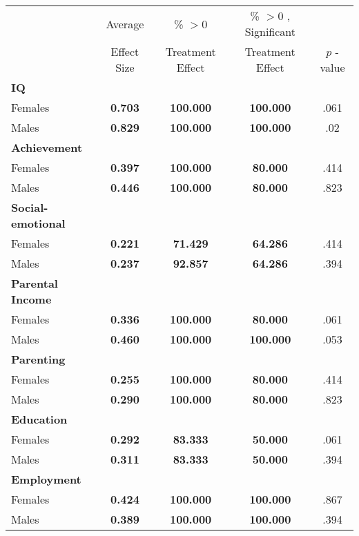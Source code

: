 \begin{tabular}{l c c c c}
\toprule
 & Average & \% $ >0 $ & \% $ >0 $ , Significant & \citet{Rosenbaum_2005_Distribution_JRSS} \\
 & Effect Size & Treatment Effect & Treatment Effect & $ p $ -value \\
\midrule
\textbf{IQ} & & & & \\
\quad Females &  \textbf{    0.703} & \textbf{  100.000} & \textbf{  100.000} & .061 \\
\quad Males &  \textbf{    0.829} & \textbf{  100.000} & \textbf{  100.000} & .02 \\
\midrule
\textbf{Achievement} & & & & \\
\quad Females &  \textbf{    0.397} & \textbf{  100.000} & \textbf{   80.000} & .414 \\
\quad Males &  \textbf{    0.446} & \textbf{  100.000} & \textbf{   80.000} & .823 \\
\midrule
\textbf{Social-emotional} & & & & \\
\quad Females &  \textbf{    0.221} & \textbf{   71.429} & \textbf{   64.286} & .414 \\
\quad Males &  \textbf{    0.237} & \textbf{   92.857} & \textbf{   64.286} & .394 \\
\midrule
\textbf{Parental Income} & & & & \\
\quad Females &  \textbf{    0.336} & \textbf{  100.000} & \textbf{   80.000} & .061 \\
\quad Males &  \textbf{    0.460} & \textbf{  100.000} & \textbf{  100.000} & .053 \\
\midrule
\textbf{Parenting} & & & & \\
\quad Females &  \textbf{    0.255} & \textbf{  100.000} & \textbf{   80.000} & .414 \\
\quad Males &  \textbf{    0.290} & \textbf{  100.000} & \textbf{   80.000} & .823 \\
\midrule
\textbf{Education} & & & & \\
\quad Females &  \textbf{    0.292} & \textbf{   83.333} & \textbf{   50.000} & .061 \\
\quad Males &  \textbf{    0.311} & \textbf{   83.333} & \textbf{   50.000} & .394 \\
\midrule
\textbf{Employment} & & & & \\
\quad Females &  \textbf{    0.424} & \textbf{  100.000} & \textbf{  100.000} & .867 \\
\quad Males &  \textbf{    0.389} & \textbf{  100.000} & \textbf{  100.000} & .394 \\

\end{tabular}
